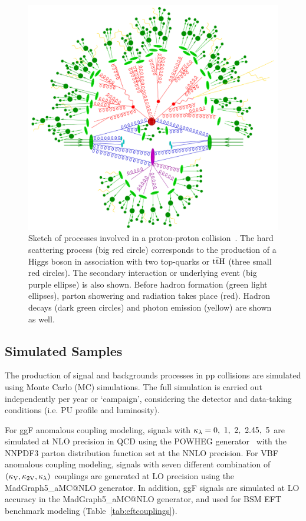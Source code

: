 \clearpage

\begin{figure}[htbp!]
\centering
\includegraphics[width=0.85\linewidth]{Figures/Modeling/Signal/collision.png}
\caption[Sketch of processes involved in a proton-proton collision]{Sketch of processes involved in a proton-proton collision~\cite{Gleisberg:2008ta}. The hard scattering process (big red circle) corresponds to the production of a Higgs boson in association with two top-quarks or $\mathrm{t\overline{t}H}$ (three small red circles). The secondary interaction or underlying event (big purple ellipse) is also shown. Before hadron formation (green light ellipses), parton showering and radiation takes place (red). Hadron decays (dark green circles) and photon emission (yellow) are shown as well.}
\label{fig:collisionproducts}
\end{figure}

\subsection{Simulated Samples}
The production of signal and backgrounds processes in pp collisions are simulated using Monte Carlo (MC) simulations. The full simulation is carried out independently per year or `campaign', considering the detector and data-taking conditions (i.e. PU profile and luminosity). 

For ggF anomalous coupling modeling, signals with $\kappa_{\lambda}=0,~1,~2,~2.45,~5$ are simulated at NLO precision in QCD using the POWHEG generator~\cite{Alioli:2008gx, Nason:2004rx, Frixione:2007vw} with the NNPDF3 parton distribution function set at the NNLO precision. For VBF anomalous coupling modeling, signals with seven different combination of $(\mathrm{\kappa_{V} }, \mathrm{\kappa_{2V} }, \kappa_{\lambda})$ couplings are generated at LO precision using the MadGraph5\_aMC@NLO generator. In addition, ggF signals are simulated at LO accuracy in the MadGraph5\_aMC@NLO generator, and used for BSM EFT benchmark modeling (Table~\ref{tab:eftcouplings}).

